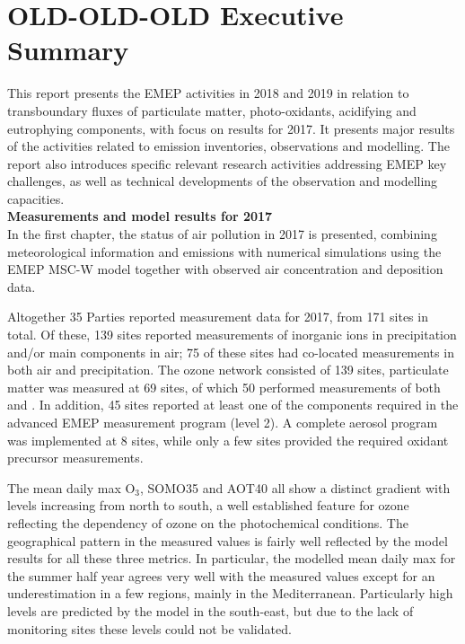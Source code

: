 \chapter*{OLD-OLD-OLD Executive Summary}
This report presents the EMEP activities in 2018 and 2019 in relation to transboundary
fluxes of particulate matter, photo-oxidants, acidifying and
eutrophying components, with focus on results
for 2017. It presents major results of the activities related to
emission inventories, observations and modelling. The report also
introduces specific relevant research activities addressing EMEP key
challenges, as well as technical developments of the observation and
modelling capacities.\\



\noindent
\textbf{Measurements and model results for 2017}\\ %
In the first chapter, the status of air pollution in 2017 is presented, combining 
meteorological information and emissions with numerical simulations using the EMEP MSC-W model 
together with observed air concentration and deposition data.

Altogether 35 Parties reported measurement data for 2017, from 171 sites in total. 
Of these, 139 sites reported measurements of inorganic ions in precipitation and/or 
main components in air; 75 of these sites had co-located measurements in both air and 
precipitation. The ozone network consisted of 139 sites, particulate matter was measured at 
69 sites, of which 50 performed measurements of both \PM[10] and \PM[2.5]. 
In addition, 45 sites reported at least one of the components required in the advanced 
EMEP measurement program (level 2). A complete aerosol program was implemented at 8 sites, 
while only a few sites provided the required oxidant precursor measurements.

The mean daily max O$_3$, SOMO35 and AOT40 all show a distinct gradient with levels increasing from north to south, a well established feature for ozone reflecting the dependency of ozone on the photochemical conditions. The geographical pattern in the measured values is fairly well reflected by the model results for all these three metrics. In particular, the modelled mean daily max for the summer half year agrees very well with the measured values except for an underestimation in a few regions, mainly in the Mediterranean. Particularly high levels are predicted by the model in the south-east, but due to the lack of monitoring sites these levels could not be validated.

